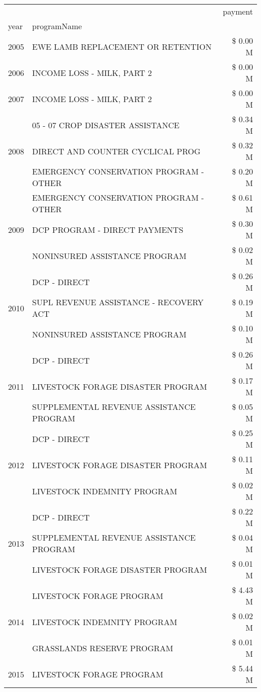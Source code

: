 \begin{tabular}{llr}
\toprule
 &  & payment \\
year & programName &  \\
\midrule
2005 & EWE LAMB REPLACEMENT OR RETENTION & \$ 0.00 M \\
\cline{1-3}
2006 & INCOME LOSS - MILK, PART 2 & \$ 0.00 M \\
\cline{1-3}
2007 & INCOME LOSS - MILK, PART 2 & \$ 0.00 M \\
\cline{1-3}
\multirow[t]{3}{*}{2008} & 05 - 07 CROP DISASTER ASSISTANCE & \$ 0.34 M \\
 & DIRECT AND COUNTER CYCLICAL PROG & \$ 0.32 M \\
 & EMERGENCY CONSERVATION PROGRAM - OTHER & \$ 0.20 M \\
\cline{1-3}
\multirow[t]{3}{*}{2009} & EMERGENCY CONSERVATION PROGRAM - OTHER & \$ 0.61 M \\
 & DCP PROGRAM - DIRECT PAYMENTS & \$ 0.30 M \\
 & NONINSURED ASSISTANCE PROGRAM & \$ 0.02 M \\
\cline{1-3}
\multirow[t]{3}{*}{2010} & DCP - DIRECT & \$ 0.26 M \\
 & SUPL REVENUE ASSISTANCE - RECOVERY ACT & \$ 0.19 M \\
 & NONINSURED ASSISTANCE PROGRAM & \$ 0.10 M \\
\cline{1-3}
\multirow[t]{3}{*}{2011} & DCP - DIRECT & \$ 0.26 M \\
 & LIVESTOCK FORAGE DISASTER PROGRAM & \$ 0.17 M \\
 & SUPPLEMENTAL REVENUE ASSISTANCE PROGRAM & \$ 0.05 M \\
\cline{1-3}
\multirow[t]{3}{*}{2012} & DCP - DIRECT & \$ 0.25 M \\
 & LIVESTOCK FORAGE DISASTER PROGRAM & \$ 0.11 M \\
 & LIVESTOCK INDEMNITY PROGRAM & \$ 0.02 M \\
\cline{1-3}
\multirow[t]{3}{*}{2013} & DCP - DIRECT & \$ 0.22 M \\
 & SUPPLEMENTAL REVENUE ASSISTANCE PROGRAM & \$ 0.04 M \\
 & LIVESTOCK FORAGE DISASTER PROGRAM & \$ 0.01 M \\
\cline{1-3}
\multirow[t]{3}{*}{2014} & LIVESTOCK FORAGE PROGRAM & \$ 4.43 M \\
 & LIVESTOCK INDEMNITY PROGRAM & \$ 0.02 M \\
 & GRASSLANDS RESERVE PROGRAM & \$ 0.01 M \\
\cline{1-3}
\multirow[t]{3}{*}{2015} & LIVESTOCK FORAGE PROGRAM & \$ 5.44 M \\

\end{tabular}
